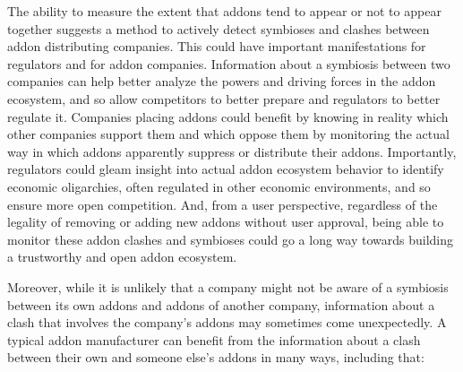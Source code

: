 \documentclass[10pt,letterpaper]{article}
\begin{document}
The ability to measure the extent that addons tend to appear or not to appear together suggests a method to actively detect symbioses and clashes between addon distributing companies. This could have important manifestations for regulators and for addon companies. Information about a symbiosis between two companies can help better analyze the powers and driving forces in the addon ecosystem, and so allow competitors to better prepare and regulators to better regulate it. Companies placing addons could benefit by knowing in reality which other companies support them and which oppose them by monitoring the actual way in which addons apparently suppress or distribute their addons. Importantly, regulators could gleam insight into actual addon ecosystem behavior to identify economic oligarchies, often regulated in other economic environments, and so ensure more open competition. And, from a user perspective, regardless of the legality of removing or adding new addons without user approval, being able to monitor these addon clashes and symbioses could go a long way towards building a trustworthy and open addon ecosystem. 

Moreover, while it is unlikely that a company might not be aware of a symbiosis between its own addons and addons of another company, information about a clash that involves the company's addons may sometimes come unexpectedly. A typical addon manufacturer can benefit from the information about a clash between their own and someone else's addons in many ways, including that:  
\end{document}
